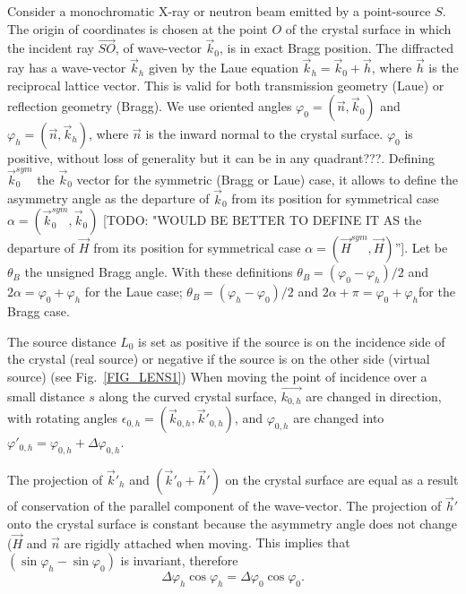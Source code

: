 \documentclass{iucr}              %
\newcommand{\todo}[1]{{\color{red}[TODO: "#1'']}}
\newcommand{\inblue}[1]{{\color{blue}#1}}
\newcommand{\inred}[1]{{\color{red}#1}}
\begin{document}
Consider a monochromatic X-ray or neutron beam emitted by a point-source $S$. The origin of coordinates is chosen at the point $O$ of the crystal surface in which the incident ray $\vec{SO}$, of wave-vector  ${\vec k_0}$, is in exact Bragg  position. The diffracted ray has a wave-vector $\vec k_h$ given by the Laue equation $\vec k_h = \vec k_0 + \vec h$, where $\vec h$ is the \inblue{reciprocal lattice vector}. This is valid for both transmission geometry (Laue) or reflection geometry (Bragg). We use oriented angles $\varphi_0 = (\vec n, \vec k_0)$ and $\varphi_h = (\vec n, \vec k_h)$, where $\vec n$ is the inward normal to the crystal surface. $\varphi_0$ is positive, without loss of generality \inred{but it can be in any quadrant???}. Defining $\vec k_0^{sym}$ the $\vec k_0$ vector for the symmetric (Bragg or Laue) case, it allows to define the asymmetry angle as the departure of $\vec k_0$ from its position for symmetrical case $\alpha = (\vec k_0^{sym}, \vec k_0)$ \todo{WOULD BE BETTER TO DEFINE IT AS the departure of $\vec H$ from its position for symmetrical case $\alpha = (\vec H^{sym}, \vec H)$}. Let be $\theta_B$ the \inred{unsigned} Bragg angle. With these definitions $\theta_B=(\varphi_0-\varphi_h)/2$ and $2\alpha=\varphi_0+\varphi_h$ for the Laue case;  $\theta_B=(\varphi_h-\varphi_0)/2$  and  $2\alpha+\pi=\varphi_0+\varphi_h$for the  Bragg case. 

The source distance $L_0$ is set as positive if the source is on the incidence side of the crystal (real source) or negative if the source is on the other side (virtual source) (see Fig.~\ref{FIG_LENS1})
When moving the point of incidence over a small distance $s$ along the curved crystal surface, $\vec{k_{0,h}}$ are changed in direction, with rotating angles $\epsilon_{0,h} = (\vec k_{0,h},\vec k'_{0,h})$, and $\varphi_{0,h}$ are changed into $\varphi'_{0,h}=\varphi_{0,h}+\Delta \varphi_{0,h}$.

The projection of  ${\vec k'_h}$ and $(\vec k'_0 + \vec h')$ on the crystal surface are equal \inred {as a result of conservation of the parallel component of the wave-vector}. The projection of $\vec h'$ \inred{onto the crystal surface} is constant\inred{ because the asymmetry angle does not change ($\vec H$ and $\vec n$ are rigidly attached when moving}. This implies that $(\sin \varphi_h - \sin \varphi_0)$ is invariant, therefore
\begin{equation}
\label{eq:invariant}
    \Delta \varphi_h \cos\varphi_h = \Delta \varphi_0 \cos\varphi_0.
\end{equation}
\end{document}
